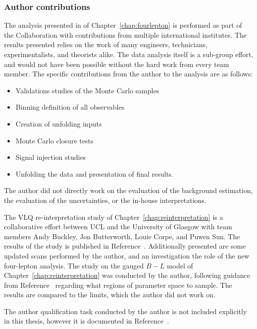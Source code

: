 \subsubsection{Author contributions}
The analysis presented in of Chapter~\ref{chap:fourlepton} is performed as part of the \ATLAS Collaboration with contributions from multiple international institutes. The results presented relies on the work of many engineers, technicians, experimentalists, and theorists alike. The data analysis itself is a sub-group effort, and would not have been possible without the hard work from every team member. The specific contributions from the author to the analysis are as follows:
\begin{itemize}
    \setlength\itemsep{-0.6em}
    \item Validations studies of the Monte Carlo samples
    \item Binning definition of all observables
    \item Creation of unfolding inputs
    \item Monte Carlo closure tests
    \item Signal injection studies
    \item Unfolding the data and presentation of final results.
\end{itemize}
The author did not directly work on the evaluation of the background estimation, the evaluation of the uncertainties, or the in-house interpretations.

The VLQ re-interpretation study of Chapter~\ref{chap:reinterpretation} is a collaborative effort between UCL and the University of Glasgow with team members Andy Buckley, Jon Butterworth, Louie Corpe, and Puwen Sun. The results of the study is published in Reference~\cite{VLQ_contur}. Additionally presented are some updated \contur scans performed by the author, and an investigation the role of the new \ATLAS four-lepton analysis. The \contur study on the gauged $B-L$ model of Chapter~\ref{chap:reinterpretation} was conducted by the author, following guidance from Reference~\cite{BLcontur} regarding what regions of parameter space to sample. The results are compared to the \ATLAS limits, which the author did not work on.

The \ATLAS author qualification task conducted by the author is not included explicitly in this thesis, however it is documented in Reference~\cite{Huang:2676143}. 